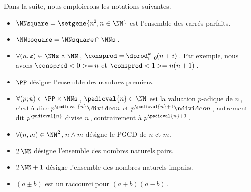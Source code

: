 Dans la suite, nous emploierons les notations suivantes.

\begin{itemize}
	\item $\NNsquare = \setgene{n^2, n \in \NN}$ est l'ensemble des carrés parfaits.

	\item $\NNssquare = \NNsquare \cap \NNs$\,.

	\item $\forall (n, k) \in \NNs \times \NN$\,, $\consprod = \dprod_{i = 0}^{k} (n + i)$\,. 
	Par exemple, nous avons $\consprod<0> = n$ et $\consprod<1> = n(n+1)$\,.

	\item $\PP$ désigne l'ensemble des nombres premiers.
	
	\item $\forall (p ; n) \in \PP \times \NNs$\,, $\padicval{n} \in \NN$ est la valuation $p$-adique de $n$\,,
	c'est-à-dire 
	$p^{\padicval{n}} \divides n$ et $p^{\padicval{n} + 1} \ndivides n$\,,
	autrement dit
	$p^{\padicval{n}}$ divise $n$\,, contrairement à $p^{\padicval{n} + 1}$\,.

	\item $\forall (n , m) \in \NN^2$, $n \wedge m$ désigne le PGCD de $n$ et $m$.
	
	\item $2\,\NN$ désigne l'ensemble des nombres naturels pairs.
	
	\item $2\,\NN + 1$ désigne l'ensemble des nombres naturels impairs.

	\item $(a \pm b)$ est un raccourci pour $(a + b) (a - b)$\,.
\end{itemize}